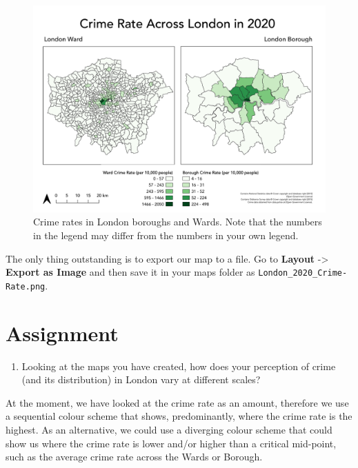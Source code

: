 \documentclass[
]{book}
\providecommand{\tightlist}{%
  \setlength{\itemsep}{0pt}\setlength{\parskip}{0pt}}
\begin{document}
\begin{figure}

{\centering \includegraphics[width=48.71in]{images/w03/london_crime_rate} 

}

\caption{Crime rates in London boroughs and Wards. Note that the numbers in the legend may differ from the numbers in your own legend.}\label{fig:03-finale-map}
\end{figure}

The only thing outstanding is to export our map to a file. Go to \textbf{Layout} -\textgreater{} \textbf{Export as Image} and then save it in your maps folder as \texttt{London\_2020\_Crime-Rate.png}.

\hypertarget{assignment-w03}{%
\section{Assignment}\label{assignment-w03}}

\begin{enumerate}
\def\labelenumi{\arabic{enumi}.}
\tightlist
\item
  Looking at the maps you have created, how does your perception of crime (and its distribution) in London vary at different scales?
\end{enumerate}

At the moment, we have looked at the crime rate as an amount, therefore we use a sequential colour scheme that shows, predominantly, where the crime rate is the highest. As an alternative, we could use a diverging colour scheme that could show us where the crime rate is lower and/or higher than a critical mid-point, such as the average crime rate across the Wards or Borough.
\end{document}
